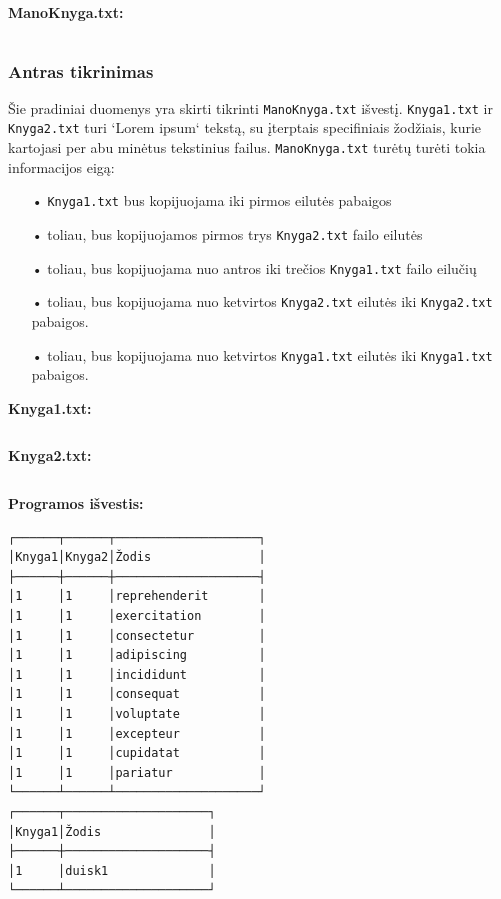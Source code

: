 \documentclass{article}
\begin{document}
\begin{changemargin}{0cm}{0cm}
    \textbf{ManoKnyga.txt:}
\end{changemargin}

\inputminted{text}{Assets/L4/t1-mk.txt}

\subsubsection{Antras tikrinimas}

Šie pradiniai duomenys yra skirti tikrinti \texttt{ManoKnyga.txt} išvestį. \texttt{Knyga1.txt} ir \texttt{Knyga2.txt} turi `Lorem ipsum` tekstą, su įterptais specifiniais
žodžiais, kurie kartojasi per abu minėtus tekstinius failus. \texttt{ManoKnyga.txt} turėtų turėti tokia informacijos eigą:
\begin{itemize}
    \item [•] \texttt{Knyga1.txt} bus kopijuojama iki pirmos eilutės pabaigos
    \item [•] toliau, bus kopijuojamos pirmos trys \texttt{Knyga2.txt} failo eilutės
    \item [•] toliau, bus kopijuojama nuo antros iki trečios \texttt{Knyga1.txt} failo eilučių
    \item [•] toliau, bus kopijuojama nuo ketvirtos \texttt{Knyga2.txt} eilutės iki \texttt{Knyga2.txt} pabaigos.
    \item [•] toliau, bus kopijuojama nuo ketvirtos \texttt{Knyga1.txt} eilutės iki \texttt{Knyga1.txt} pabaigos.
\end{itemize}

\begin{changemargin}{0cm}{0cm}
    \textbf{Knyga1.txt:}
\end{changemargin}

\inputminted{text}{Assets/L4/t2-k1.txt}

\vspace{0.5cm}

\begin{changemargin}{0cm}{0cm}
    \textbf{Knyga2.txt:}
\end{changemargin}


\inputminted{text}{Assets/L4/t2-k2.txt}

\begin{changemargin}{0cm}{0cm}
    \textbf{Programos išvestis:}
\end{changemargin}

\begin{verbatim}
┌──────┬──────┬────────────────────┐
│Knyga1│Knyga2│Žodis               │
├──────┼──────┼────────────────────┤
│1     │1     │reprehenderit       │
│1     │1     │exercitation        │
│1     │1     │consectetur         │
│1     │1     │adipiscing          │
│1     │1     │incididunt          │
│1     │1     │consequat           │
│1     │1     │voluptate           │
│1     │1     │excepteur           │
│1     │1     │cupidatat           │
│1     │1     │pariatur            │
└──────┴──────┴────────────────────┘
┌──────┬────────────────────┐
│Knyga1│Žodis               │
├──────┼────────────────────┤
│1     │duisk1              │
└──────┴────────────────────┘
\end{verbatim}
\end{document}
